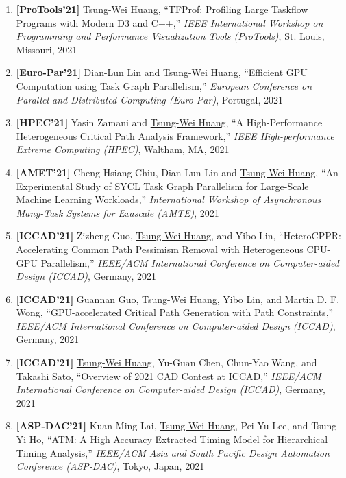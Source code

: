 \documentclass[A4,11pt]{article}
\begin{document}
\begin{enumerate}
    \item \textbf{[ProTools'21]} \underline{Tsung-Wei Huang}, ``TFProf: Profiling Large Taskflow Programs with Modern D3 and C++,'' \textit{IEEE International Workshop on Programming and Performance Visualization Tools (ProTools)}, St. Louis, Missouri, 2021

    \item \textbf{[Euro-Par'21]} Dian-Lun Lin and \underline{Tsung-Wei Huang}, ``Efficient GPU Computation using Task Graph Parallelism,'' \textit{European Conference on Parallel and Distributed Computing (Euro-Par)}, Portugal, 2021

    \item \textbf{[HPEC'21]} Yasin Zamani and \underline{Tsung-Wei Huang}, ``A High-Performance Heterogeneous Critical Path Analysis Framework,'' \textit{IEEE High-performance Extreme Computing (HPEC)}, Waltham, MA, 2021
    
    \item \textbf{[AMET'21]} Cheng-Hsiang Chiu, Dian-Lun Lin and \underline{Tsung-Wei Huang}, ``An Experimental Study of SYCL Task Graph Parallelism for Large-Scale Machine Learning Workloads,'' \textit{International Workshop of Asynchronous Many-Task Systems for Exascale (AMTE)}, 2021

    \item \textbf{[ICCAD'21]} Zizheng Guo, \underline{Tsung-Wei Huang}, and Yibo Lin, ``HeteroCPPR: Accelerating Common Path Pessimism Removal with Heterogeneous CPU-GPU Parallelism,'' \textit{IEEE/ACM International Conference on Computer-aided Design (ICCAD)}, Germany, 2021

    \item \textbf{[ICCAD'21]} Guannan Guo, \underline{Tsung-Wei Huang}, Yibo Lin, and Martin D. F. Wong, ``GPU-accelerated Critical Path Generation with Path Constraints,'' \textit{IEEE/ACM International Conference on Computer-aided Design (ICCAD)}, Germany, 2021

    \item \textbf{[ICCAD'21]} \underline{Tsung-Wei Huang}, Yu-Guan Chen, Chun-Yao Wang, and Takashi Sato, ``Overview of 2021 CAD Contest at ICCAD,'' \textit{IEEE/ACM International Conference on Computer-aided Design (ICCAD)}, Germany, 2021

    \item \textbf{[ASP-DAC'21]} Kuan-Ming Lai, \underline{Tsung-Wei Huang}, Pei-Yu Lee, and Tsung-Yi Ho, ``ATM: A High Accuracy Extracted Timing Model for Hierarchical Timing Analysis,'' \textit{IEEE/ACM Asia and South Pacific Design Automation Conference (ASP-DAC)}, Tokyo, Japan, 2021


\end{enumerate}
\end{document}
